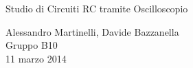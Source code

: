 \begin{center}

     	{\huge Studio di Circuiti RC tramite Oscilloscopio }

     	\vspace{0.2cm}
	\vspace{0.3cm}

      	{\large Alessandro Martinelli, Davide Bazzanella} \\
		{ Gruppo B10} \\
	
	\vspace{0.1cm}
      	{ 11 marzo 2014}

\end{center}
